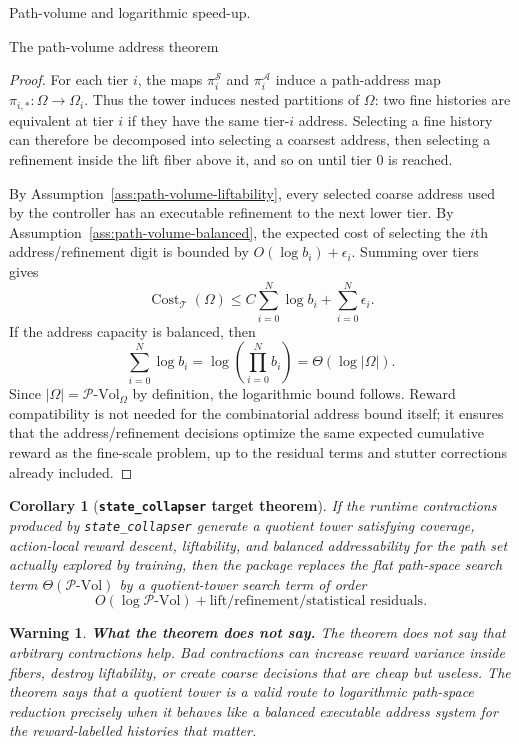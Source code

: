 \documentclass[11pt]{article}
\newtheorem{warning}[subsubsection]{Warning}
\newtheorem{corollary}[subsubsection]{Corollary}
\newcommand{\PVol}{\mathcal{P}\text{-}\mathrm{Vol}}
\newcommand{\cost}{\operatorname{Cost}}
\begin{document}
\begin{section}{Path-volume and logarithmic speed-up.}
\begin{subsection}{The path-volume address theorem}
\begin{proof}
For each tier $i$, the maps
$
\pi_i^{\mathcal S}
$
and
$
\pi_i^{\mathcal A}
$
induce a path-address map
$
\pi_{i,*}:\Omega\to\Omega_i.
$
Thus the tower induces nested partitions of $\Omega$: two fine histories are equivalent at tier $i$ if they have the same tier-$i$ address. Selecting a fine history can therefore be decomposed into selecting a coarsest address, then selecting a refinement inside the lift fiber above it, and so on until tier $0$ is reached.

By Assumption~\ref{ass:path-volume-liftability}, every selected coarse address used by the controller has an executable refinement to the next lower tier. By Assumption~\ref{ass:path-volume-balanced}, the expected cost of selecting the $i$th address/refinement digit is bounded by
$
O(\log b_i)+\epsilon_i.
$
Summing over tiers gives
$$
\cost_{\mathcal{T}}(\Omega)
\le
C\sum_{i=0}^{N}\log b_i
+
\sum_{i=0}^{N}\epsilon_i.
$$
If the address capacity is balanced, then
$$
\sum_{i=0}^{N}\log b_i
=
\log\left(\prod_{i=0}^{N}b_i\right)
=
\Theta(\log|\Omega|).
$$
Since $|\Omega|=\PVol_{\Omega}$ by definition, the logarithmic bound follows. Reward compatibility is not needed for the combinatorial address bound itself; it ensures that the address/refinement decisions optimize the same expected cumulative reward as the fine-scale problem, up to the residual terms and stutter corrections already included.
\end{proof}

\begin{corollary}[{\bf \texttt{state\_collapser} target theorem}]\label{cor:state-collapser-path-volume}
If the runtime contractions produced by \texttt{state\_collapser} generate a quotient tower satisfying coverage, action-local reward descent, liftability, and balanced addressability for the path set actually explored by training, then the package replaces the flat path-space search term
$
\Theta(\PVol)
$
by a quotient-tower search term of order
$$
O(\log \PVol)
+
\text{lift/refinement/statistical residuals}.
$$
\end{corollary}

\begin{warning}
{\bf What the theorem does not say.}
\normalfont
The theorem does not say that arbitrary contractions help. Bad contractions can increase reward variance inside fibers, destroy liftability, or create coarse decisions that are cheap but useless. The theorem says that a quotient tower is a valid route to logarithmic path-space reduction precisely when it behaves like a balanced executable address system for the reward-labelled histories that matter.
\end{warning}


\end{subsection}
\end{section}
\end{document}
